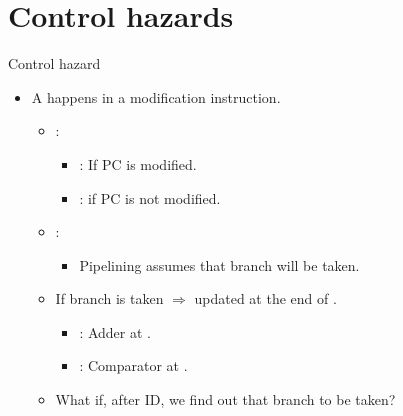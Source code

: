 \section{Control hazards}

\begin{frame}[t]{Control hazard}
\begin{itemize}
  \item A  happens in a 
        modification instruction.

    \begin{itemize}
      \item {}:
        \begin{itemize}
          \item {}: If PC is modified.
          \item {}: if PC is not modified.
        \end{itemize}

      \item {}:
        \begin{itemize}
          \item Pipelining assumes that branch will  be taken.
        \end{itemize}

      \item If branch is taken $\Rightarrow$  updated at the end of .
        \begin{itemize}
          \item {}: Adder at .
          \item {}: Comparator at .
        \end{itemize}

      \item What if, after ID, we find out that branch  to be taken?
    \end{itemize}
\end{itemize}
\end{frame}

